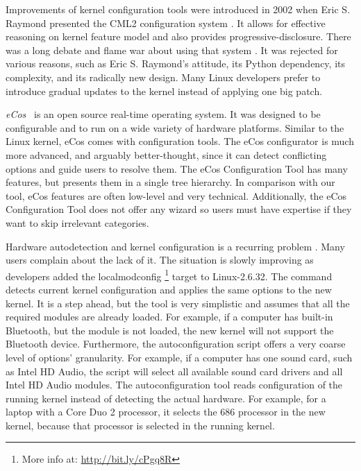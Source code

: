 \documentclass{chi2009}
\begin{document}
Improvements of kernel configuration tools were introduced in 2002 when Eric S. Raymond presented the CML2 configuration system \cite{raymond:cml2:2000}. It
allows for effective reasoning on kernel feature model and also provides progressive-disclosure. There was a long debate and flame war about using that system
\cite{kerneltrap:linux:2002}. It was rejected for various reasons, such as Eric S. Raymond's attitude, its Python dependency, its complexity, and its radically
new design. Many Linux developers prefer to introduce gradual updates to the kernel instead of applying one big patch.

\textit{eCos}~\cite{veer:ecos:2000} is an open source real-time operating system. It was designed to be configurable and to run on a wide variety of hardware
platforms. Similar to the Linux kernel, eCos comes with configuration tools. The eCos configurator is much more advanced, and arguably better-thought, since
it can detect conflicting options and guide users to resolve them. The eCos Configuration Tool has many features, but presents them in a single tree hierarchy.
In comparison with our tool, eCos features are often low-level and very technical. Additionally, the eCos Configuration Tool does not offer any wizard so users
must have expertise if they want to skip irrelevant categories.

Hardware autodetection and kernel configuration is a recurring problem \cite{debian:config:2010,soft32:config:2007}. Many users complain about the lack of it.
The situation is slowly improving as developers added the \textsf{localmodconfig} \footnote{More info at: \url{http://bit.ly/cPgq8R}} target to Linux-2.6.32.
The command detects current kernel configuration and applies the same options to the new kernel. It is a step ahead, but the tool is very simplistic and assumes
that all the required modules are already loaded. For example, if a computer has built-in Bluetooth, but the module is not loaded, the new kernel will not
support the Bluetooth device. Furthermore, the autoconfiguration script offers a very coarse level of options' granularity. For example, if a computer has one
sound card, such as Intel HD Audio, the script will select all available sound card drivers and all Intel HD Audio modules. The autoconfiguration tool reads
configuration of the running kernel instead of detecting the actual hardware. For example, for a laptop with a Core Duo 2 processor, it selects the 686
processor in the new kernel, because that processor is selected in the running kernel.
\end{document}
